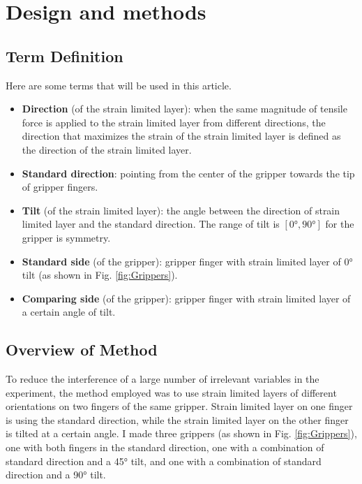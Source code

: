 \documentclass[conference]{IEEEtran}
\begin{document}
\section{Design and methods}


\subsection{Term Definition}
Here are some terms that will be used in this article.
\begin{itemize}
    \item \textbf{Direction} (of the strain limited layer): when the same magnitude of tensile force is applied to the strain limited layer from different directions, the direction that maximizes the strain of the strain limited layer is defined as the direction of the strain limited layer.
    \item \textbf{Standard direction}: pointing from the center of the gripper towards the tip of gripper fingers.
    \item \textbf{Tilt} (of the strain limited layer): the angle between the direction of strain limited layer and the standard direction. The range of tilt is $[0°,90°]$ for the gripper is symmetry.
    \item \textbf{Standard side} (of the gripper): gripper finger with strain limited layer of 0° tilt (as shown in Fig. \ref{fig:Grippers}).
    \item \textbf{Comparing side} (of the gripper): gripper finger with strain limited layer of a certain angle of tilt.
\end{itemize}

\subsection{Overview of Method}

To reduce the interference of a large number of irrelevant variables in the experiment, the method employed was to use strain limited layers of different orientations on two fingers of the same gripper. Strain limited layer on one finger is using the standard direction, while the strain limited layer on the other finger is tilted at a certain angle. I made three grippers (as shown in Fig. \ref{fig:Grippers}), one with both fingers in the standard direction, one with a combination of standard direction and a 45° tilt, and one with a combination of standard direction and a 90° tilt. 
\end{document}
